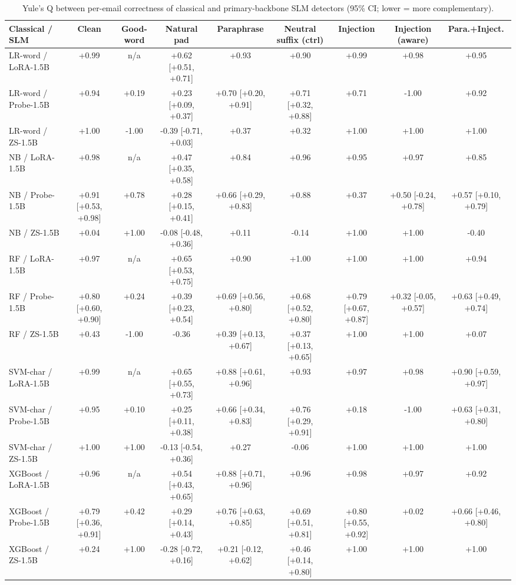 \begin{table}[t]
\centering
\caption{Yule's Q between per-email correctness of classical and primary-backbone SLM detectors (95\% CI; lower = more complementary).}
\label{tab:q}
\footnotesize
\begin{tabular}{lcccccccc}
\toprule
\textbf{Classical / SLM} & \textbf{Clean} & \textbf{Good-word} & \textbf{Natural pad} & \textbf{Paraphrase} & \textbf{Neutral suffix (ctrl)} & \textbf{Injection} & \textbf{Injection (aware)} & \textbf{Para.+Inject.} \\
\midrule
LR-word / LoRA-1.5B & +0.99 & n/a & +0.62 [+0.51, +0.71] & +0.93 & +0.90 & +0.99 & +0.98 & +0.95 \\
LR-word / Probe-1.5B & +0.94 & +0.19 & +0.23 [+0.09, +0.37] & +0.70 [+0.20, +0.91] & +0.71 [+0.32, +0.88] & +0.71 & -1.00 & +0.92 \\
LR-word / ZS-1.5B & +1.00 & -1.00 & -0.39 [-0.71, +0.03] & +0.37 & +0.32 & +1.00 & +1.00 & +1.00 \\
NB / LoRA-1.5B & +0.98 & n/a & +0.47 [+0.35, +0.58] & +0.84 & +0.96 & +0.95 & +0.97 & +0.85 \\
NB / Probe-1.5B & +0.91 [+0.53, +0.98] & +0.78 & +0.28 [+0.15, +0.41] & +0.66 [+0.29, +0.83] & +0.88 & +0.37 & +0.50 [-0.24, +0.78] & +0.57 [+0.10, +0.79] \\
NB / ZS-1.5B & +0.04 & +1.00 & -0.08 [-0.48, +0.36] & +0.11 & -0.14 & +1.00 & +1.00 & -0.40 \\
RF / LoRA-1.5B & +0.97 & n/a & +0.65 [+0.53, +0.75] & +0.90 & +1.00 & +1.00 & +1.00 & +0.94 \\
RF / Probe-1.5B & +0.80 [+0.60, +0.90] & +0.24 & +0.39 [+0.23, +0.54] & +0.69 [+0.56, +0.80] & +0.68 [+0.52, +0.80] & +0.79 [+0.67, +0.87] & +0.32 [-0.05, +0.57] & +0.63 [+0.49, +0.74] \\
RF / ZS-1.5B & +0.43 & -1.00 & -0.36 & +0.39 [+0.13, +0.67] & +0.37 [+0.13, +0.65] & +1.00 & +1.00 & +0.07 \\
SVM-char / LoRA-1.5B & +0.99 & n/a & +0.65 [+0.55, +0.73] & +0.88 [+0.61, +0.96] & +0.93 & +0.97 & +0.98 & +0.90 [+0.59, +0.97] \\
SVM-char / Probe-1.5B & +0.95 & +0.10 & +0.25 [+0.11, +0.38] & +0.66 [+0.34, +0.83] & +0.76 [+0.29, +0.91] & +0.18 & -1.00 & +0.63 [+0.31, +0.80] \\
SVM-char / ZS-1.5B & +1.00 & +1.00 & -0.13 [-0.54, +0.36] & +0.27 & -0.06 & +1.00 & +1.00 & +1.00 \\
XGBoost / LoRA-1.5B & +0.96 & n/a & +0.54 [+0.43, +0.65] & +0.88 [+0.71, +0.96] & +0.96 & +0.98 & +0.97 & +0.92 \\
XGBoost / Probe-1.5B & +0.79 [+0.36, +0.91] & +0.42 & +0.29 [+0.14, +0.43] & +0.76 [+0.63, +0.85] & +0.69 [+0.51, +0.81] & +0.80 [+0.55, +0.92] & +0.02 & +0.66 [+0.46, +0.80] \\
XGBoost / ZS-1.5B & +0.24 & +1.00 & -0.28 [-0.72, +0.16] & +0.21 [-0.12, +0.62] & +0.46 [+0.14, +0.80] & +1.00 & +1.00 & +1.00 \\
\bottomrule
\end{tabular}
\end{table}
